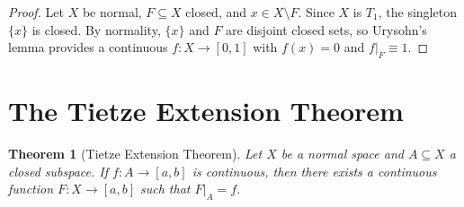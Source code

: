 \documentclass[11pt,a4paper,twoside]{book}
\newtheorem{theorem}{Theorem}[section]
\theoremstyle{remark}
\theoremstyle{definition}
\theoremstyle{definition}
\begin{document}
\begin{proof}
Let $X$ be normal, $F\subseteq X$ closed, and $x\in X\setminus F$.
Since $X$ is $T_1$, the singleton $\{x\}$ is closed.  By normality,
$\{x\}$ and $F$ are disjoint closed sets, so Urysohn's lemma provides
a continuous $f\colon X\to[0,1]$ with $f(x)=0$ and $f|_F\equiv 1$.
\end{proof}

\section{The Tietze Extension Theorem}
\label{sec:tietze}

\begin{theorem}[Tietze Extension Theorem]
\label{thm:tietze-extension}
Let $X$ be a normal space and $A\subseteq X$ a closed subspace.  If
$f\colon A\to[a,b]$ is continuous, then there exists a continuous
function $F\colon X\to[a,b]$ such that $F|_A = f$.
\end{theorem}
\end{document}
